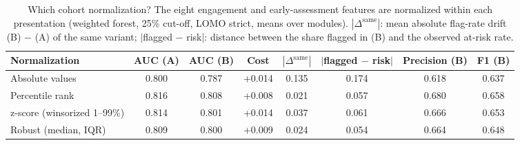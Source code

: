 \begin{table}[t]
\centering
\caption{Which cohort normalization? The eight engagement and early-assessment features are normalized within each presentation (weighted forest, 25\% cut-off, LOMO strict, means over modules). $|\Delta^{\mathrm{same}}|$: mean absolute flag-rate drift (B) $-$ (A) of the same variant; $|$flagged $-$ risk$|$: distance between the share flagged in (B) and the observed at-risk rate.}
\label{tab:normalisation}
\footnotesize
\begin{tabular}{@{}lccccccc@{}}
\toprule
Normalization & AUC (A) & AUC (B) & Cost & $|\Delta^{\mathrm{same}}|$ & $|$flagged $-$ risk$|$ & Precision (B) & F1 (B) \\
\midrule
Absolute values & 0.800 & 0.787 & +0.014 & 0.135 & 0.174 & 0.618 & 0.637 \\
Percentile rank & 0.816 & 0.808 & +0.008 & 0.021 & 0.057 & 0.680 & 0.658 \\
z-score (winsorized 1--99\%) & 0.814 & 0.801 & +0.014 & 0.037 & 0.061 & 0.666 & 0.653 \\
Robust (median, IQR) & 0.809 & 0.800 & +0.009 & 0.024 & 0.054 & 0.664 & 0.648 \\
\bottomrule
\end{tabular}
\end{table}
